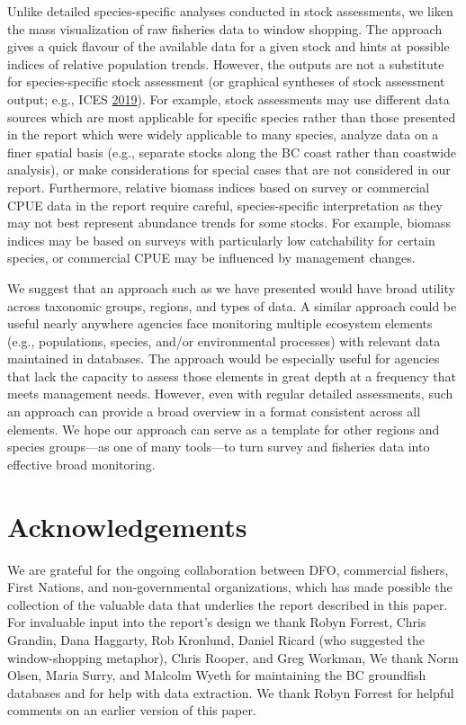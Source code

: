 \documentclass[12pt,]{article}
\begin{document}
Unlike detailed species-specific analyses conducted in stock assessments, we liken the mass visualization of raw fisheries data to window shopping. The approach gives a quick flavour of the available data for a given stock and hints at possible indices of relative population trends. However, the outputs are not a substitute for species-specific stock assessment (or graphical syntheses of stock assessment output; e.g., ICES \protect\hyperlink{ref-ices2019}{2019}). For example, stock assessments may use different data sources which are most applicable for specific species rather than those presented in the report which were widely applicable to many species, analyze data on a finer spatial basis (e.g., separate stocks along the BC coast rather than coastwide analysis), or make considerations for special cases that are not considered in our report. Furthermore, relative biomass indices based on survey or commercial CPUE data in the report require careful, species-specific interpretation as they may not best represent abundance trends for some stocks. For example, biomass indices may be based on surveys with particularly low catchability for certain species, or commercial CPUE may be influenced by management changes.

We suggest that an approach such as we have presented would have broad utility across taxonomic groups, regions, and types of data. A similar approach could be useful nearly anywhere agencies face monitoring multiple ecosystem elements (e.g., populations, species, and/or environmental processes) with relevant data maintained in databases. The approach would be especially useful for agencies that lack the capacity to assess those elements in great depth at a frequency that meets management needs. However, even with regular detailed assessments, such an approach can provide a broad overview in a format consistent across all elements.
We hope our approach can serve as a template for other regions and species groups---as one of many tools---to turn survey and fisheries data into effective broad monitoring.

\hypertarget{acknowledgements}{%
\section*{Acknowledgements}\label{acknowledgements}}

We are grateful for the ongoing collaboration between DFO, commercial fishers, First Nations, and non-governmental organizations, which has made possible the collection of the valuable data that underlies the report described in this paper. For invaluable input into the report's design we thank Robyn Forrest, Chris Grandin, Dana Haggarty, Rob Kronlund, Daniel Ricard (who suggested the window-shopping metaphor), Chris Rooper, and Greg Workman, We thank Norm Olsen, Maria Surry, and Malcolm Wyeth for maintaining the BC groundfish databases and for help with data extraction. We thank Robyn Forrest for helpful comments on an earlier version of this paper.
\end{document}
